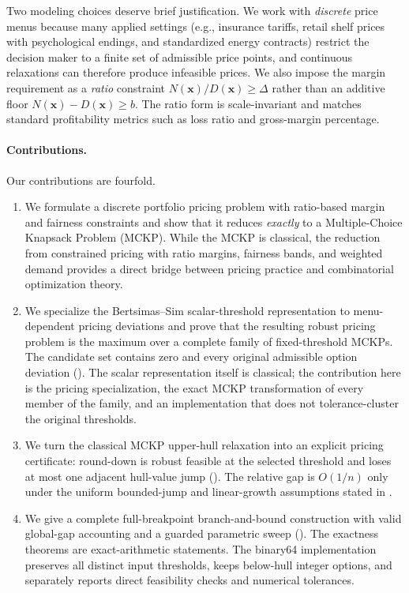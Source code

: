\documentclass[11pt, a4paper]{article}
\theoremstyle{plain}
\theoremstyle{definition}
\theoremstyle{remark}
\begin{document}
Two modeling choices deserve brief justification. We work with \emph{discrete} price menus because many applied settings (e.g., insurance tariffs, retail shelf prices with psychological endings, and standardized energy contracts) restrict the decision maker to a finite set of admissible price points, and continuous relaxations can therefore produce infeasible prices. We also impose the margin requirement as a \emph{ratio} constraint $N(\bm{x})/D(\bm{x}) \geq \Delta$ rather than an additive floor $N(\bm{x}) - D(\bm{x}) \geq b$. The ratio form is scale-invariant and matches standard profitability metrics such as loss ratio and gross-margin percentage.
\paragraph{Contributions.}
Our contributions are fourfold.
\begin{enumerate}
\item[(i)] We formulate a discrete portfolio pricing problem with ratio-based margin and fairness constraints and show that it reduces \emph{exactly} to a Multiple-Choice Knapsack Problem (MCKP). While the MCKP is classical, the reduction from constrained pricing with ratio margins, fairness bands, and weighted demand provides a direct bridge between pricing practice and combinatorial optimization theory.

\item[(ii)] We specialize the Bertsimas--Sim scalar-threshold representation to menu-dependent pricing deviations and prove that the resulting robust pricing problem is the maximum over a complete family of fixed-threshold MCKPs.  The candidate set contains zero and every original admissible option deviation ().  The scalar representation itself is classical; the contribution here is the pricing specialization, the exact MCKP transformation of every member of the family, and an implementation that does not tolerance-cluster the original thresholds.

\item[(iii)] We turn the classical MCKP upper-hull relaxation into an explicit pricing certificate: round-down is robust feasible at the selected threshold and loses at most one adjacent hull-value jump ().  The relative gap is $O(1/n)$ only under the uniform bounded-jump and linear-growth assumptions stated in .

\item[(iv)] We give a complete full-breakpoint branch-and-bound construction with valid global-gap accounting and a guarded parametric sweep ().  The exactness theorems are exact-arithmetic statements.  The binary64 implementation preserves all distinct input thresholds, keeps below-hull integer options, and separately reports direct feasibility checks and numerical tolerances.
\end{enumerate}
\end{document}
